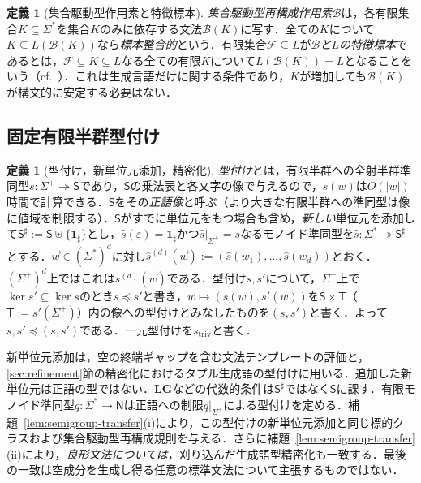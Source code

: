 \documentclass[11pt,a4paper]{ltjsarticle}
\numberwithin{equation}{section}
\theoremstyle{plain}
\theoremstyle{definition}
\newtheorem{definition}[theorem]{定義}
\theoremstyle{remark}
\newcommand{\tuple}[1]{\vec{#1}}
\newcommand{\eps}{\varepsilon}
\begin{document}
\begin{definition}[集合駆動型作用素と特徴標本]
\label{def:characteristic-sample}
\emph{集合駆動型再構成作用素}$\mathcal B$は，各有限集合$K\subseteq\Sigma^*$を集合$K$のみに依存する文法$\mathcal B(K)$に写す．全ての$K$について$K\subseteq L(\mathcal B(K))$なら\emph{標本整合的}という．有限集合$\mathcal F\subseteq L$が\emph{$\mathcal B$と$L$の特徴標本}であるとは，$\mathcal F\subseteq K\subseteq L$なる全ての有限$K$について$L(\mathcal B(K))=L$となることをいう（cf.~\cite{deLaHiguera1997}）．これは生成言語だけに関する条件であり，$K$が増加しても$\mathcal B(K)$が構文的に安定する必要はない．
\end{definition}

\subsection{固定有限半群型付け}
\label{subsec:semigroup-typing}

\begin{definition}[型付け，新単位元添加，精密化]
\label{def-monoid-morphism}
\label{def:semigroup-typing}
\label{def:h-refinement}
\emph{型付け}とは，有限半群への全射半群準同型$s:\Sigma^+\twoheadrightarrow\mathsf S$であり，$\mathsf S$の乗法表と各文字の像で与えるので，$s(w)$は$O(|w|)$時間で計算できる．$\mathsf S$をその\emph{正語像}と呼ぶ（より大きな有限半群への準同型は像に値域を制限する）．$\mathsf S$がすでに単位元をもつ場合も含め，\emph{新しい}単位元を添加して$\mathsf S^\sharp:=\mathsf S\uplus\{\mathbf1_\sharp\}$とし，$\widehat{s}(\eps)=\mathbf1_\sharp$かつ$\widehat{s}|_{\Sigma^+}=s$なるモノイド準同型を$\widehat{s}:\Sigma^*\twoheadrightarrow\mathsf S^\sharp$とする．$\tuple w\in(\Sigma^*)^d$に対し$\widehat{s}^{(d)}(\tuple w):=(\widehat{s}(w_1),\ldots,\widehat{s}(w_d))$とおく．$(\Sigma^+)^d$上ではこれは$s^{(d)}(\tuple w)$である．型付け$s,s'$について，$\Sigma^+$上で$\ker s'\subseteq\ker s$のとき$s\preceq s'$と書き，$w\mapsto(s(w),s'(w))$を$\mathsf S\times\mathsf T$（$\mathsf T:=s'(\Sigma^+)$）内の像への型付けとみなしたものを$(s,s')$と書く．よって$s,s'\preceq(s,s')$である．一元型付けを$s_{\mathrm{triv}}$と書く．
\end{definition}

新単位元添加は，空の終端ギャップを含む文法テンプレートの評価と，\ref{sec:refinement}節の精密化におけるタプル生成語の型付けに用いる．追加した新単位元は正語の型ではない．$\mathbf{LG}$などの代数的条件は$\mathsf S^\sharp$ではなく$\mathsf S$に課す．有限モノイド準同型$q:\Sigma^*\to\mathsf N$は正語への制限$q|_{\Sigma^+}$による型付けを定める．補題~\ref{lem:semigroup-transfer}(i)により，この型付けの新単位元添加と同じ標的クラスおよび集合駆動型再構成規則を与える．さらに補題~\ref{lem:semigroup-transfer}(ii)により，\emph{良形文法については}，刈り込んだ生成語型精密化も一致する．最後の一致は空成分を生成し得る任意の標準文法について主張するものではない．
\end{document}
